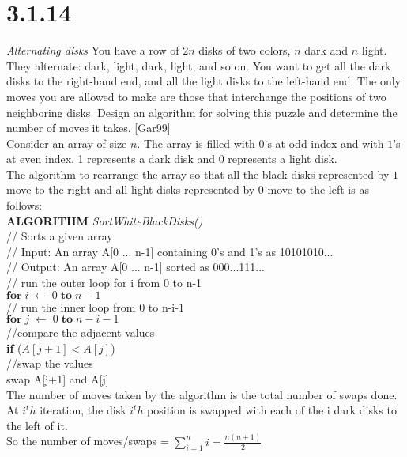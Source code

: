 \documentclass[8pt, letterpaper]{article}
\begin{document}
\section{3.1.14}
\textit{Alternating disks} \indent You have a row of $2n$ disks of two colors, $n$ dark and $n$ light. They alternate: dark, light, dark, light, and so on. You want to get all the dark
disks to the right-hand end, and all the light disks to the left-hand end. The only moves you are allowed to make are those that interchange the positions of two neighboring disks. Design an algorithm for solving this puzzle and determine the number of moves it takes. [Gar99] \\
\indent Consider an array of size $n$. The array is filled with $0$'s at odd index and with $1$'s at even index. 1 represents a dark disk and 0 represents a light disk. \\
The algorithm to rearrange the array so that all the black disks represented by $1$ move to the right and all light disks represented by $0$ move to the left is as follows: \\
\textbf{ALGORITHM} \textit{SortWhiteBlackDisks()} \\
\indent // Sorts a given array \\
\indent // Input: An array A[0 ... n-1] containing 0's and 1's as 10101010... \\
\indent // Output: An array A[0 ... n-1] sorted as 000...111... \\
\indent // run the outer loop for i from 0 to n-1 \\
\indent $\textbf{for}\; i \; \leftarrow \; 0 \; \textbf{to} \; n-1$ \\
\indent \indent // run the inner loop from 0 to n-i-1 \\
\indent \indent $\textbf{for} \; j \; \leftarrow \; 0 \; \textbf{to} \; n-i-1$ \\
\indent \indent \indent //compare the adjacent values \\
\indent \indent \indent \textbf{if} ($A[j+1] < A[j]$) \\
\indent \indent \indent \indent //swap the values \\
\indent \indent \indent \indent swap A[j+1] and A[j] \\
The number of moves taken by the algorithm is the total number of swaps done. At $i^th$ iteration, the disk $i^th$ position is swapped with each of the i dark disks to the left of it. \\
So the number of moves/swaps = $\sum\limits_{i=1}^n i = \frac{n(n+1)}{2}$
\end{document}
